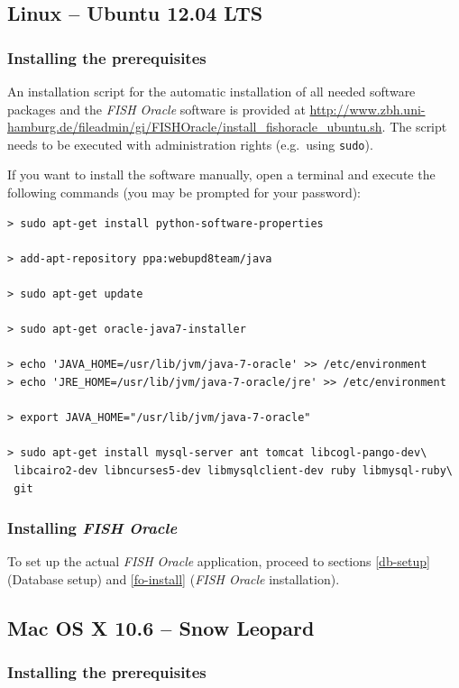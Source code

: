 \documentclass[11pt,final]{article}
\newcommand{\FO}[0]{\emph{FISH Oracle}\xspace}
\begin{document}
\subsection{Linux -- Ubuntu 12.04 LTS}
\label{ubuntu}

\subsubsection*{Installing the prerequisites}

An installation script for the automatic installation of all needed software
packages and the \FO software is provided at
\url{http://www.zbh.uni-hamburg.de/fileadmin/gi/FISHOracle/install_fishoracle_ubuntu.sh}.
The script needs to be executed with administration rights (e.g.\ using
\texttt{sudo}).

If you want to install the software manually, open a terminal
and execute the following commands (you may be prompted for your password):

\begin{lstlisting}
> sudo apt-get install python-software-properties

> add-apt-repository ppa:webupd8team/java

> sudo apt-get update

> sudo apt-get oracle-java7-installer

> echo 'JAVA_HOME=/usr/lib/jvm/java-7-oracle' >> /etc/environment
> echo 'JRE_HOME=/usr/lib/jvm/java-7-oracle/jre' >> /etc/environment

> export JAVA_HOME="/usr/lib/jvm/java-7-oracle"

> sudo apt-get install mysql-server ant tomcat libcogl-pango-dev\
 libcairo2-dev libncurses5-dev libmysqlclient-dev ruby libmysql-ruby\
 git
\end{lstlisting}

\subsubsection*{Installing \FO}

To set up the actual \FO application, proceed to sections \ref{db-setup}
(Database setup) and \ref{fo-install} (\FO installation).

\subsection{Mac OS X 10.6 -- Snow Leopard}
\label{macosx}

\subsubsection*{Installing the prerequisites}
\end{document}
